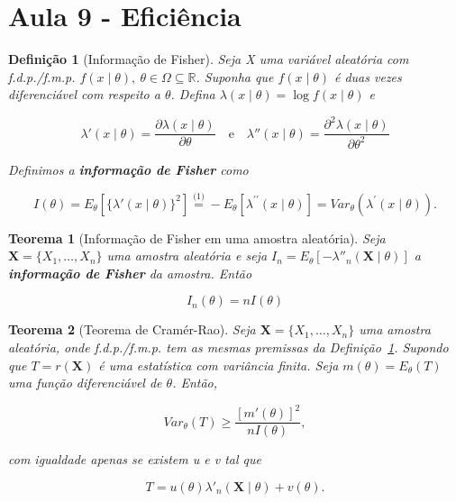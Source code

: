 \documentclass{article}
\newtheorem{theorem}{Teorema}
\newtheorem{definition}{Definição}
\begin{document}
\section*{Aula 9 - Eficiência}

\begin{definition}[Informação de Fisher]\label{def:fis}
Seja X uma variável aleatória com f.d.p./f.m.p. $f(x \mid \theta), \ \theta \in \Omega \subseteq \mathbb{R}$. Suponha que $f(x \mid \theta)$ é duas vezes diferenciável com respeito a $\theta$. Defina $\lambda (x \mid \theta) = \log f(x \mid \theta)$ e

\begin{equation}
    \lambda' (x \mid \theta) = \frac{\partial \lambda (x \mid \theta)}{\partial \theta} \quad \text{e} \quad \lambda'' (x \mid \theta) = \frac{\partial^2 \lambda(x \mid \theta)}{\partial \theta^2}
\end{equation}

Definimos a \textbf{informação de Fisher} como

\begin{equation}
    I(\theta) = E_\theta \left [ \{ \lambda'(x \mid \theta) \}^2 \right ] \stackrel{\text{(1)}}{=} -E_\theta\left[\lambda^{\prime\prime}(x \mid \theta)\right] = Var_\theta\left(\lambda^{\prime}(x\mid \theta) \right).
\end{equation}
\end{definition}

\begin{theorem}[Informação de Fisher em uma amostra aleatória]
Seja $\textbf{X} = \{ X_1, \ldots, X_n \}$ uma amostra aleatória e seja $I_n = E_\theta [- \lambda''_n (\textbf{X} \mid \theta)]$ a \textbf{informação de Fisher} da amostra. Então

$$I_n(\theta) = n I(\theta)$$
\end{theorem}

\begin{theorem}[Teorema de Cramér-Rao]
Seja $\textbf{X} = \{ X_1, \ldots, X_n \}$ uma amostra aleatória, onde f.d.p./f.m.p. tem as mesmas premissas da Definição~\ref{def:fis}. Supondo que $T = r(\textbf{X})$ é uma estatística com variância finita. Seja $m(\theta) = E_\theta(T)$ uma função diferenciável de $\theta$. Então,

\begin{equation}
    Var_\theta(T) \geq \frac{[m'(\theta)]^2}{n I(\theta)},
\end{equation}

com igualdade apenas se existem u e v tal que

$$T = u(\theta) \lambda'_n (\textbf{X} \mid \theta) + v(\theta).$$
\end{theorem}
\end{document}
